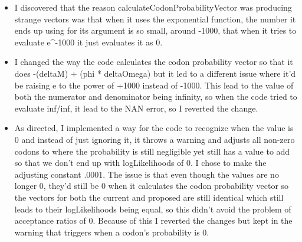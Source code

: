 \documentclass[11pt]{labbook}
\begin{document}
    \begin{itemize}
        \item I discovered that the reason calculateCodonProbabilityVector was producing strange vectors was that when it uses the exponential function, the number it ends up using for its argument is so small, around -1000, that when it tries to evaluate e^-1000 it just evaluates it as 0.
        \item I changed the way the code calculates the codon probability vector so that it does -(deltaM) + (phi * deltaOmega) but it led to a different issue where it'd be raising e to the power of +1000 instead of -1000. This lead to the value of both the numerator and denominator being infinity, so when the code tried to evaluate inf/inf, it lead to the NAN error, so I reverted the change.
        \item As directed, I implemented a way for the code to recognize when the value is 0 and instead of just ignoring it, it throws a warning and adjusts all non-zero codons to where the probability is still negligible yet still has a value to add so that we don't end up with logLikelihoods of 0. I chose to make the adjusting constant .0001. The issue is that even though the values are no longer 0, they'd still be 0 when it calculates the codon probability vector so the vectors for both the current and proposed are still identical which still leads to their logLikelihoods being equal, so this didn't avoid the problem of acceptance ratios of 0. Because of this I reverted the changes but kept in the warning that triggers when a codon's probability is 0.
    \end{itemize}
    
\end{document}
